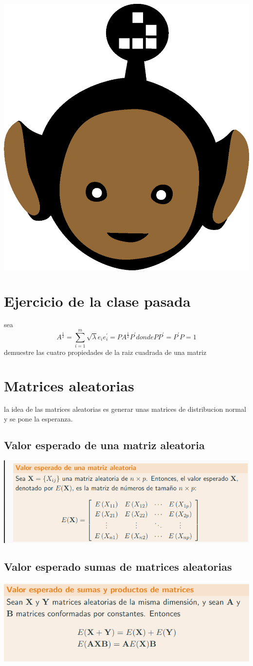 \documentclass[10pt,a4paper]{article} %
\begin{document}
    \title{\rmfamily\normalfont{}}
    \author{}
    \date{\today} 
    
    \maketitle
     

    \includegraphics[width=0.1\linewidth]{negro_cara.png}
    \section{Ejercicio de la clase pasada}
        sea 
        \begin{equation}
            A ^{ \frac{1}{2}}  = \sum_{i=1}^{m} \sqrt{\lambda } e_i e_i ^{'}  = PA ^{ \frac{1}{2}} P ^{'}  donde PP ^{'}  = P ^{'}P = 1 
        \end{equation}
        demuestre las cuatro propiedades de la raiz cuadrada de una matriz

    \section{Matrices aleatorias}
        la idea de las matrices aleatorias es generar unas matrices de
        distribucion normal y se pone la esperanza.
        \subsection{Valor esperado de una matriz aleatoria}
            \includegraphics[width=0.8\linewidth]{valoresperadom.png}
        \subsection{Valor esperado sumas de matrices aleatorias}
            \includegraphics[width=0.8\linewidth]{valorsumasproductosm.png}
\end{document}
